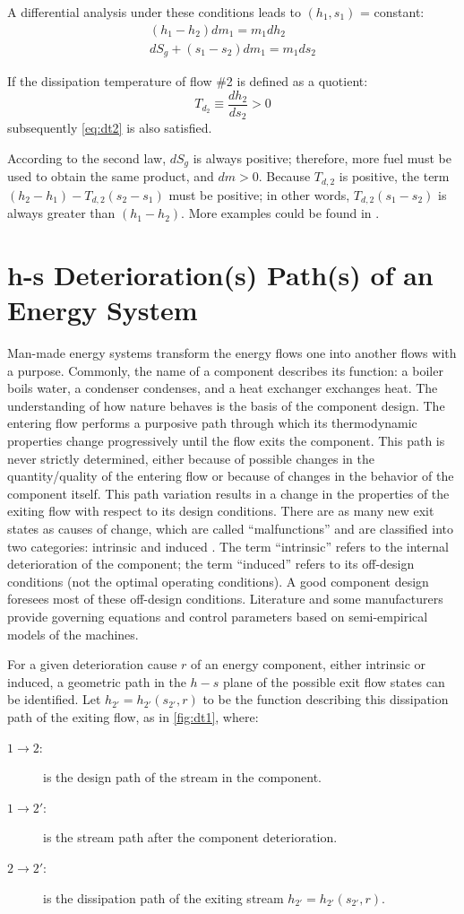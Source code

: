 \documentclass[energies,article,submit,moreauthors,pdftex]{Definitions/mdpi}
\begin{document}
A differential analysis under these conditions leads to $(h_1,s_1)$ = constant:
\begin{align}
\left(h_1 - h_2\right) dm_1 = m_1 dh_2 \\
dS_g + \left(s_1 - s_2\right) dm_1 =  m_1 ds_2 
\end{align}

If the dissipation temperature of flow \#2 is defined as a quotient:
\[
	T_{d_2}\equiv \frac{dh_2}{ds_2}>0
\]
subsequently \cref{eq:dt2} is also satisfied.

According to the second law, $dS_g$ is always positive; therefore, more fuel must be used to obtain the same product, and $dm > 0$. Because $T_{d,2}$ is positive, the term $(h_2-h_1 )-T_{d,2} (s_2-s_1 )$ must be positive; in other words, $T_{d,2} (s_1-s_2)$ is always greater than $(h_1-h_2)$. More examples could be found in \cite{Royo1995}.

\section{h-s Deterioration(s) Path(s) of an Energy System}
Man-made energy systems transform the energy flows one into another flows with a purpose. Commonly, the name of a component describes its function: a boiler boils water, a condenser condenses, and a heat exchanger exchanges heat. The understanding of how nature behaves is the basis of the component design. The entering flow performs a purposive path through which its thermodynamic properties change progressively until the flow exits the component. This path is never strictly determined, either because of possible changes in the quantity/quality of the entering flow or because of changes in the behavior of the component itself. This path variation results in a change in the properties of the exiting flow with respect to its design conditions. There are as many new exit states as causes of change, which are called “malfunctions” and are classified into two categories: intrinsic and induced \cite{Valero2004c,Valero1999c,Torres1999}. The term “intrinsic” refers to the internal deterioration of the component; the term “induced” refers to its off-design conditions (not the optimal operating conditions). A good component design foresees most of these off-design conditions. Literature and some manufacturers provide governing equations and control parameters based on semi-empirical models of the machines.

For a given deterioration cause $r$ of an energy component, either intrinsic or induced, a geometric path in the $h-s$ plane of the possible exit flow states can be identified. Let $h_{2'}=h_{2'}(s_{2'}, r)$ to be the function describing this dissipation path of the exiting flow, as in \cref{fig:dt1}, where:
\begin{description}
	\item[$1 \longrightarrow 2:$]  is the design path of the stream in the component.
	\item[$1 \longrightarrow 2':$] is the stream path after the component deterioration.
	\item[$2 \longrightarrow 2':$] is the dissipation path of the exiting stream $h_{2'} = h_{2'} (s_{2'}, r).$
\end{description}
\end{document}

